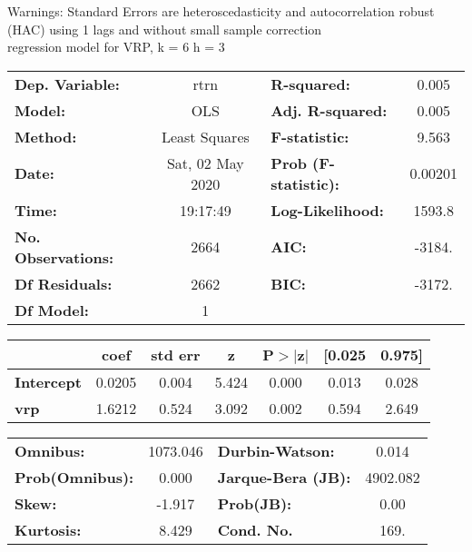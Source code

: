 Warnings: \newline
 [1] Standard Errors are heteroscedasticity and autocorrelation robust (HAC) using 1 lags and without small sample correction\\ 

regression model for VRP, k = 6 h = 3\begin{center}
\begin{tabular}{lclc}
\toprule
\textbf{Dep. Variable:}    &       rtrn       & \textbf{  R-squared:         } &     0.005   \\
\textbf{Model:}            &       OLS        & \textbf{  Adj. R-squared:    } &     0.005   \\
\textbf{Method:}           &  Least Squares   & \textbf{  F-statistic:       } &     9.563   \\
\textbf{Date:}             & Sat, 02 May 2020 & \textbf{  Prob (F-statistic):} &  0.00201    \\
\textbf{Time:}             &     19:17:49     & \textbf{  Log-Likelihood:    } &    1593.8   \\
\textbf{No. Observations:} &        2664      & \textbf{  AIC:               } &    -3184.   \\
\textbf{Df Residuals:}     &        2662      & \textbf{  BIC:               } &    -3172.   \\
\textbf{Df Model:}         &           1      & \textbf{                     } &             \\
\bottomrule
\end{tabular}
\begin{tabular}{lcccccc}
                   & \textbf{coef} & \textbf{std err} & \textbf{z} & \textbf{P$> |$z$|$} & \textbf{[0.025} & \textbf{0.975]}  \\
\midrule
\textbf{Intercept} &       0.0205  &        0.004     &     5.424  &         0.000        &        0.013    &        0.028     \\
\textbf{vrp}       &       1.6212  &        0.524     &     3.092  &         0.002        &        0.594    &        2.649     \\
\bottomrule
\end{tabular}
\begin{tabular}{lclc}
\textbf{Omnibus:}       & 1073.046 & \textbf{  Durbin-Watson:     } &    0.014  \\
\textbf{Prob(Omnibus):} &   0.000  & \textbf{  Jarque-Bera (JB):  } & 4902.082  \\
\textbf{Skew:}          &  -1.917  & \textbf{  Prob(JB):          } &     0.00  \\
\textbf{Kurtosis:}      &   8.429  & \textbf{  Cond. No.          } &     169.  \\
\bottomrule
\end{tabular}
\end{center}

